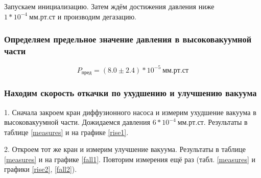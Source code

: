 \documentclass[a4paper, 12pt]{article}
\begin{document}
            Запускаем инициализацию. Затем ждём достижения давления ниже $ 1*10^{-4}~мм.рт.ст$ и производим дегазацию.

        \subsubsection{Определяем предельное значение давления в высоковакуумной части}

            $$ P_{пред} = (8.0 \pm 2.4)*10^{-5}~мм.рт.ст $$

        \subsubsection{Находим скорость откачки по ухудшению и улучшению вакуума}

            1. Сначала закроем кран диффузионного насоса и измерим ухудшение вакуума в высоковакуумной части. Дожидаемся давления $6*10^{-4}~мм.рт.ст$. Результаты в таблице \ref{measures} и на графике \ref{rise1}.

            2. Откроем тот же кран и измерим улучшение вакуума. Результаты в таблице \ref{measures} и на графике \ref{fall1}. Повторим измерения ещё раз (табл. \ref{measures} и графики \ref{rise2}, \ref{fall2}).
\end{document}
